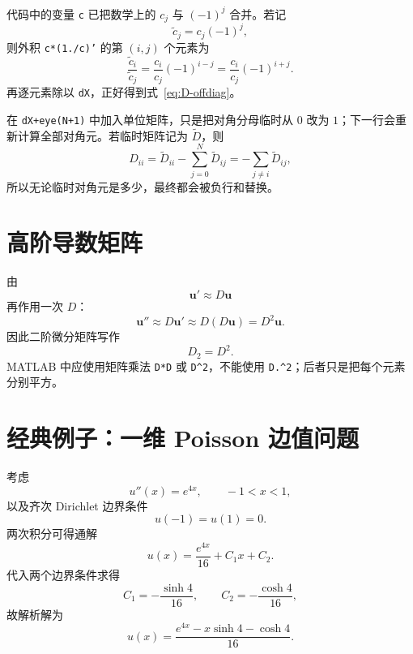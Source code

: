 \documentclass[11pt,a4paper]{ctexart}
\numberwithin{equation}{section}
\newcommand{\vect}[1]{\bm{#1}}
\begin{document}
代码中的变量 \texttt{c} 已把数学上的 $c_j$ 与 $(-1)^j$ 合并。若记
\begin{equation}
  \widetilde c_j=c_j(-1)^j,
\end{equation}
则外积 \texttt{c*(1./c)'} 的第 $(i,j)$ 个元素为
\begin{equation}
  \frac{\widetilde c_i}{\widetilde c_j}
  =\frac{c_i}{c_j}(-1)^{i-j}
  =\frac{c_i}{c_j}(-1)^{i+j}.
\end{equation}
再逐元素除以 \texttt{dX}，正好得到式~\eqref{eq:D-offdiag}。

在 \texttt{dX+eye(N+1)} 中加入单位矩阵，只是把对角分母临时从 $0$ 改为 $1$；下一行会重新计算全部对角元。若临时矩阵记为 $\widetilde D$，则
\begin{equation}
  D_{ii}=\widetilde D_{ii}-\sum_{j=0}^N\widetilde D_{ij}
  =-\sum_{j\ne i}\widetilde D_{ij},
\end{equation}
所以无论临时对角元是多少，最终都会被负行和替换。

\section{高阶导数矩阵}

由
\begin{equation}
  \vect{u}'\approx D\vect{u}
\end{equation}
再作用一次 $D$：
\begin{equation}
  \vect{u}''\approx D\vect{u}'\approx D(D\vect{u})=D^2\vect{u}.
\end{equation}
因此二阶微分矩阵写作
\begin{equation}
  \boxed{D_2=D^2}.
\end{equation}
MATLAB 中应使用矩阵乘法 \texttt{D*D} 或 \texttt{D\string^2}，不能使用 \texttt{D.\string^2}；后者只是把每个元素分别平方。

\section{经典例子：一维 Poisson 边值问题}

考虑
\begin{equation}
  u''(x)=e^{4x},\qquad -1<x<1,
  \label{eq:poisson}
\end{equation}
以及齐次 Dirichlet 边界条件
\begin{equation}
  u(-1)=u(1)=0.
\end{equation}
两次积分可得通解
\begin{equation}
  u(x)=\frac{e^{4x}}{16}+C_1x+C_2.
\end{equation}
代入两个边界条件求得
\begin{equation}
  C_1=-\frac{\sinh4}{16},
  \qquad C_2=-\frac{\cosh4}{16},
\end{equation}
故解析解为
\begin{equation}
  \boxed{u(x)=\frac{e^{4x}-x\sinh4-\cosh4}{16}}.
\end{equation}
\end{document}
